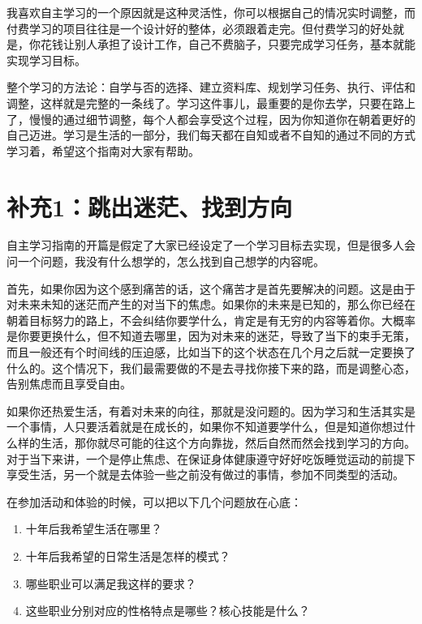 \documentclass[
]{book}
\providecommand{\tightlist}{%
  \setlength{\itemsep}{0pt}\setlength{\parskip}{0pt}}
\begin{document}
我喜欢自主学习的一个原因就是这种灵活性，你可以根据自己的情况实时调整，而付费学习的项目往往是一个设计好的整体，必须跟着走完。但付费学习的好处就是，你花钱让别人承担了设计工作，自己不费脑子，只要完成学习任务，基本就能实现学习目标。

整个学习的方法论：自学与否的选择、建立资料库、规划学习任务、执行、评估和调整，这样就是完整的一条线了。学习这件事儿，最重要的是你去学，只要在路上了，慢慢的通过细节调整，每个人都会享受这个过程，因为你知道你在朝着更好的自己迈进。学习是生活的一部分，我们每天都在自知或者不自知的通过不同的方式学习着，希望这个指南对大家有帮助。

\hypertarget{ux8865ux51451ux8df3ux51faux8ff7ux832bux627eux5230ux65b9ux5411}{%
\chapter{补充1：跳出迷茫、找到方向}\label{ux8865ux51451ux8df3ux51faux8ff7ux832bux627eux5230ux65b9ux5411}}

自主学习指南的开篇是假定了大家已经设定了一个学习目标去实现，但是很多人会问一个问题，我没有什么想学的，怎么找到自己想学的内容呢。

首先，如果你因为这个感到痛苦的话，这个痛苦才是首先要解决的问题。这是由于对未来未知的迷茫而产生的对当下的焦虑。如果你的未来是已知的，那么你已经在朝着目标努力的路上，不会纠结你要学什么，肯定是有无穷的内容等着你。大概率是你要更换什么，但不知道去哪里，因为对未来的迷茫，导致了当下的束手无策，而且一般还有个时间线的压迫感，比如当下的这个状态在几个月之后就一定要换了什么的。这个情况下，我们最需要做的不是去寻找你接下来的路，而是调整心态，告别焦虑而且享受自由。

如果你还热爱生活，有着对未来的向往，那就是没问题的。因为学习和生活其实是一个事情，人只要活着就是在成长的，如果你不知道要学什么，但是知道你想过什么样的生活，那你就尽可能的往这个方向靠拢，然后自然而然会找到学习的方向。对于当下来讲，一个是停止焦虑、在保证身体健康遵守好好吃饭睡觉运动的前提下享受生活，另一个就是去体验一些之前没有做过的事情，参加不同类型的活动。

在参加活动和体验的时候，可以把以下几个问题放在心底：

\begin{enumerate}
\def\labelenumi{\arabic{enumi}.}
\tightlist
\item
  十年后我希望生活在哪里？
\item
  十年后我希望的日常生活是怎样的模式？
\item
  哪些职业可以满足我这样的要求？
\item
  这些职业分别对应的性格特点是哪些？核心技能是什么？
\end{enumerate}
\end{document}
